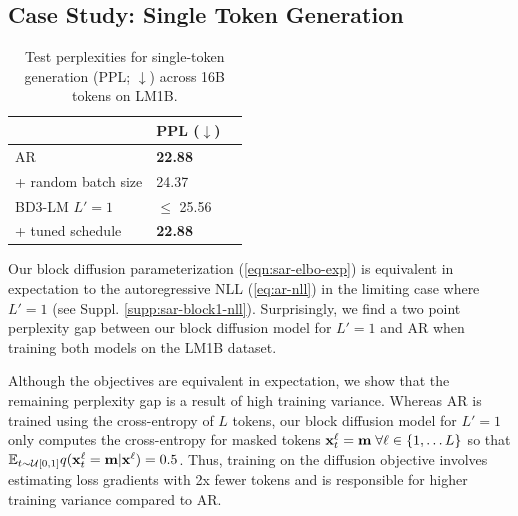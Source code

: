 \documentclass{article} %
\def\algo{BD3-LM}
\begin{document}
\subsection{Case Study: Single Token Generation}
\begin{table}
    \small
  \vspace{-15pt}
  \caption{Test perplexities for single-token generation (PPL; $\downarrow$) across 16B tokens on LM1B.}
  \label{tab:bs1-var}
  \centering
  \begin{tabular}{lll}
    \toprule
    & PPL ($\downarrow$)  \\
    \midrule
    AR  & \textbf{22.88} \\
    \hspace{1em} + random batch size & 24.37 \\
    \midrule
    \algo{} $L'=1$ & $\leq$ 25.56\\
    \hspace{1em} + tuned schedule & \textbf{22.88} \\
    \bottomrule
  \end{tabular}
  \vspace{-10px}
\end{table}
Our block diffusion parameterization (\ref{eqn:sar-elbo-exp}) is equivalent in expectation to the autoregressive NLL (\ref{eq:ar-nll}) in the limiting case where $L'=1$ (see Suppl. \ref{supp:sar-block1-nll}). Surprisingly, we find a two point perplexity gap between our block diffusion model for $L'=1$ and AR when training both models on the LM1B dataset.


Although the objectives are equivalent in expectation, we show that the remaining perplexity gap is a result of high training variance. Whereas AR is trained using the cross-entropy of $L$ tokens, our block diffusion model for $L'=1$ only computes the cross-entropy for masked tokens ${\mathbf x}^\ell_t = {\mathbf m} \; \forall \ell \in \{ 1, \dots L \}$ so that $\mathbb{E}_{t \sim \mathcal{U}[0,1]} q({\mathbf x}^\ell_t = {\mathbf m} | {\mathbf x}^\ell) = 0.5$. Thus, training on the diffusion objective involves estimating loss gradients with 2x fewer tokens and is responsible for higher training variance compared to AR.
\end{document}
